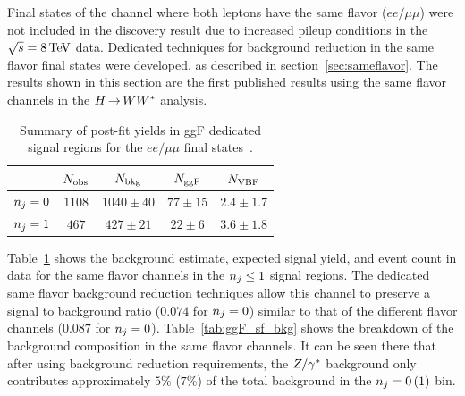Final states of the \HWWfull channel where both leptons have the same flavor ($ee/\mu\mu$) were not included in the discovery result due to increased pileup conditions in the $\sqrt{s} = 8 \TeV$ data. Dedicated techniques for background reduction in the same flavor final states were developed, as described in section~\ref{sec:sameflavor}. The results shown in this section are the first published results using the same flavor channels in the $H{\,{\rightarrow}\,}WW^\ast$ analysis. 

\begin{table}[h!]
\centering
\captionsetup{justification=centering}

\hspace{-10pt}
\begin{tabular}{|c|c|c|c|c|}
\hline
 & $N_{\rm obs}$ & $N_{\rm bkg}$ & $N_{\rm ggF}$ & $N_{\rm VBF}$ \\ \hline
$n_j = 0$ & $1108$ & $1040 \pm 40$ & $77 \pm 15$ & $2.4 \pm 1.7$ \\ \hline
$n_j = 1$ & $467$ & $427 \pm 21$ & $22 \pm 6$ & $3.6 \pm 1.8$ \\ \hline
\end{tabular}

\caption{
Summary of post-fit yields in ggF dedicated signal regions for the $ee/\mu\mu$ final states~\cite{WW2015}. 
}
\label{tab:ggF_sf}
\end{table}

Table~\ref{tab:ggF_sf} shows the background estimate, expected signal yield, and event count in data for the same flavor channels in the $n_j \leq 1$ signal regions. The dedicated same flavor background reduction techniques allow this channel to preserve a signal to background ratio ($0.074$ for $n_j = 0$) similar to that of the different flavor channels ($0.087$ for $n_j = 0$). Table~\ref{tab:ggF_sf_bkg} shows the breakdown of the background composition in the same flavor channels. It can be seen there that after using background reduction requirements, the $Z/\gamma^{\ast}$ background only contributes approximately $5\%$ ($7\%$) of the total background in the $n_j = 0\,(1)$ bin. 

